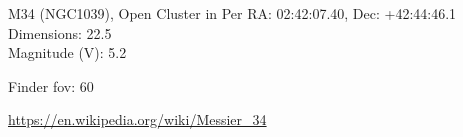 \begin{block}{M34 (NGC1039), Open Cluster in Per}
    RA: 02:42:07.40, Dec: +42:44:46.1 \\ 
    Dimensions: 22.5 \\ 
    Magnitude (V): 5.2



    Finder fov: 60 

    \url{https://en.wikipedia.org/wiki/Messier_34} 
\end{block}